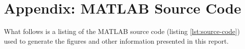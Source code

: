 \documentclass{ajhlabreport}
\begin{document}
\newpage
\chapter{Appendix: MATLAB Source Code}

What follows is a listing of the MATLAB source code (listing
\ref{lst:source-code}) used to generate the figures and other information
presented in this report.


\end{document}
